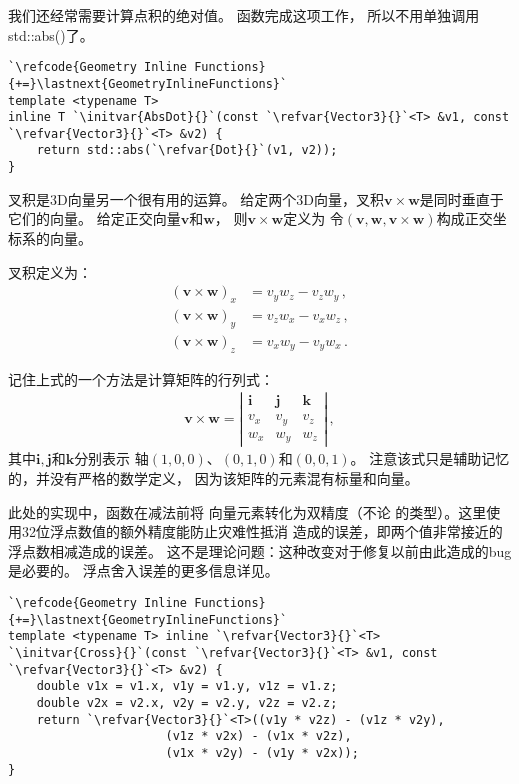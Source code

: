 我们还经常需要计算点积的绝对值。
函数完成这项工作，
所以不用单独调用{\ttfamily std::abs()}了。
\begin{lstlisting}
`\refcode{Geometry Inline Functions}{+=}\lastnext{GeometryInlineFunctions}`
template <typename T>
inline T `\initvar{AbsDot}{}`(const `\refvar{Vector3}{}`<T> &v1, const `\refvar{Vector3}{}`<T> &v2) {
    return std::abs(`\refvar{Dot}{}`(v1, v2));
}
\end{lstlisting}

叉积是3D向量另一个很有用的运算。
给定两个3D向量，叉积$\bm v\times\bm w$是同时垂直于它们的向量。
给定正交向量$\bm v$和$\bm w$，
则$\bm v\times\bm w$定义为
令$(\bm v,\bm w,\bm v\times\bm w)$构成正交坐标系的向量。

叉积定义为：
\begin{align*}
    (\bm v\times\bm w)_x & = v_y w_z- v_z w_y\, , \\
    (\bm v\times\bm w)_y & = v_z w_x- v_x w_z\, , \\
    (\bm v\times\bm w)_z & = v_x w_y- v_y w_x\, .
\end{align*}

记住上式的一个方法是计算矩阵的行列式：
\begin{align*}
    \bm v\times\bm w=\left|
    \begin{array}{ccc}
        \mathbf{i} & \mathbf{j} & \mathbf{k} \\
        v_x        & v_y        & v_z        \\
        w_x        & w_y        & w_z
    \end{array}\right|\, ,
\end{align*}
其中$\mathbf{i},\mathbf{j}$和$\mathbf{k}$分别表示
轴$(1,0,0)$、$(0,1,0)$和$(0,0,1)$。
注意该式只是辅助记忆的，并没有严格的数学定义，
因为该矩阵的元素混有标量和向量。

此处的实现中，函数在减法前将
向量元素转化为双精度（不论
的类型）。这里使用32位浮点数值的额外精度能防止灾难性抵消
造成的误差，即两个值非常接近的浮点数相减造成的误差。
这不是理论问题：这种改变对于修复以前由此造成的bug是必要的。
浮点舍入误差的更多信息详见。
\begin{lstlisting}
`\refcode{Geometry Inline Functions}{+=}\lastnext{GeometryInlineFunctions}`
template <typename T> inline `\refvar{Vector3}{}`<T>
`\initvar{Cross}{}`(const `\refvar{Vector3}{}`<T> &v1, const `\refvar{Vector3}{}`<T> &v2) {
    double v1x = v1.x, v1y = v1.y, v1z = v1.z;
    double v2x = v2.x, v2y = v2.y, v2z = v2.z;
    return `\refvar{Vector3}{}`<T>((v1y * v2z) - (v1z * v2y),
                      (v1z * v2x) - (v1x * v2z),
                      (v1x * v2y) - (v1y * v2x));
} 
\end{lstlisting}

